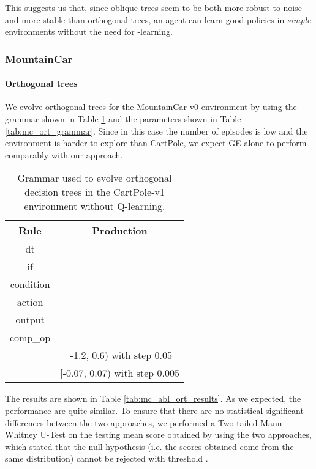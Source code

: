 \documentclass[review,english]{elsarticle}
\begin{document}
This suggests us that, since oblique trees seem to be both more robust to noise and more stable than orthogonal trees, an agent can learn good policies in \textit{simple} environments without the need for -learning.

\subsubsection{MountainCar}
\paragraph{Orthogonal trees}
We evolve orthogonal trees for the MountainCar-v0 environment by using the grammar shown in Table \ref{tab:mc_abl_ort_grammar} and the parameters shown in Table \ref{tab:mc_ort_grammar}.
Since in this case the number of episodes is low and the environment is harder to explore than CartPole, we expect GE alone to perform comparably with our approach.

\begin{table}
    \centering
    \begin{tabular}{|c|c|} \hline
        \textbf{Rule} & \textbf{Production} \\ \hline
        dt &  \\ if &  \\ condition &  \\ action &  \\ output &  \\ comp\_op &  \\  & [-1.2, 0.6) with step 0.05 \\  & [-0.07, 0.07) with step 0.005 \\ \hline
    \end{tabular}
    \caption{Grammar used to evolve orthogonal decision trees in the CartPole-v1 environment without Q-learning.}
    \label{tab:mc_abl_ort_grammar}
\end{table}

The results are shown in Table \ref{tab:mc_abl_ort_results}.
As we expected, the performance are quite similar.
To ensure that there are no statistical significant differences between the two approaches, we performed a Two-tailed Mann-Whitney U-Test on the testing mean score obtained by using the two approaches, which stated that the null hypothesis (i.e. the scores obtained come from the same distribution) cannot be rejected with threshold .
\end{document}
